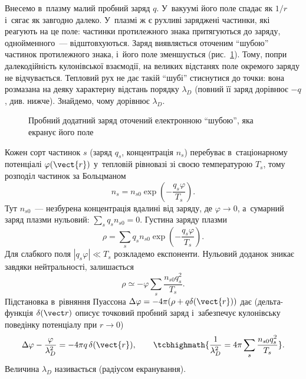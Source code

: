 Внесемо в~плазму малий пробний заряд $q$. У~вакуумі його поле
спадає як $1/r$ і~сягає як завгодно далеко. У~плазмі ж є рухливі
заряджені частинки, які реагують на це поле: частинки протилежного
знака притягуються до заряду, однойменного~--- відштовхуються. Заряд
виявляється оточеним \enquote{шубою} частинок протилежного знака, і~його
поле зменшується (рис.~\ref{tikz:debye-sphere}). Тому, попри далекодійність кулонівської
взаємодії, на великих відстанях поле окремого заряду не
відчувається. Тепловий рух не дає такій \enquote{шубі} стиснутися до точки:
вона розмазана на деяку характерну відстань порядку $\lambda_D$ (повний її заряд
дорівнює $-q$, див. нижче). Знайдемо, чому дорівнює $\lambda_D$.

\begin{figure}\centering
{}
\caption{Пробний додатний заряд оточений електронною \enquote{шубою}, яка екранує його
поле}
\label{tikz:debye-sphere}
\end{figure}

Кожен сорт частинок $s$ (заряд $q_s$, концентрація $n_s$) перебуває в~стаціонарному потенціалі $\varphi(\vect{r})$
у~тепловій рівновазі зі своєю температурою $T_s$, тому розподіл частинок за Больцманом
\begin{equation*}
	n_s=n_{s0}\exp\left(-\frac{q_s\varphi}{T_s}\right).
\end{equation*}
Тут $n_{s0}$~--- незбурена концентрація вдалині від заряду, де $\varphi\to0$, а~сумарний
заряд плазми нульовий: $\sum_sq_sn_{s0}=0$. Густина заряду плазми
\begin{equation*}
	\rho=\sum_sq_sn_{s0}\exp\left(-\frac{q_s\varphi}{T_s}\right).
\end{equation*}
Для слабкого поля $|q_s\varphi|\ll T_s$ розкладемо експоненти. Нульовий
доданок зникає завдяки нейтральності, залишається
\begin{equation*}
	\rho\simeq-\varphi\sum_s\frac{n_{s0}q_s^2}{T_s}.
\end{equation*}
Підстановка в~рівняння Пуассона $\Delta\varphi=-4\pi(\rho+q\delta(\vect{r}))$ дає
(дельта-функція $\delta(\vect r)$ описує точковий пробний заряд і~забезпечує кулонівську поведінку потенціалу при $r\to0$)
\begin{equation}\label{eq:poisson-screened}
	\Delta\varphi-\frac{\varphi}{\lambda_D^2}=-4\pi q\,\delta(\vect{r}),
	\qquad
	\tcbhighmath{\frac{1}{\lambda_D^2}=4\pi\sum_s\frac{n_{s0}q_s^2}{T_s}}.
\end{equation}
Величина $\lambda_D$ називається  (радіусом екранування).

